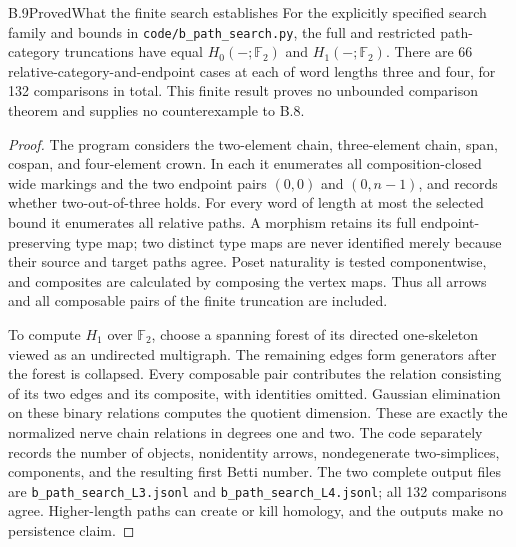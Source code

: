 \begin{result}{B.9}{Proved}{What the finite search establishes}
For the explicitly specified search family and bounds in
\texttt{code/b\_path\_search.py}, the full and restricted path-category truncations have equal $H_0(-;\mathbb F_2)$ and $H_1(-;\mathbb F_2)$. There are 66 relative-category-and-endpoint cases at each of word lengths three and four, for 132 comparisons in total. This finite result proves no unbounded comparison theorem and supplies no counterexample to B.8.
\end{result}
\begin{proof}
The program considers the two-element chain, three-element chain, span, cospan, and four-element crown. In each it enumerates all composition-closed wide markings and the two endpoint pairs $(0,0)$ and $(0,n-1)$, and records whether two-out-of-three holds. For every word of length at most the selected bound it enumerates all relative paths. A morphism retains its full endpoint-preserving type map; two distinct type maps are never identified merely because their source and target paths agree. Poset naturality is tested componentwise, and composites are calculated by composing the vertex maps. Thus all arrows and all composable pairs of the finite truncation are included.

To compute $H_1$ over $\mathbb F_2$, choose a spanning forest of its directed one-skeleton viewed as an undirected multigraph. The remaining edges form generators after the forest is collapsed. Every composable pair contributes the relation consisting of its two edges and its composite, with identities omitted. Gaussian elimination on these binary relations computes the quotient dimension. These are exactly the normalized nerve chain relations in degrees one and two. The code separately records the number of objects, nonidentity arrows, nondegenerate two-simplices, components, and the resulting first Betti number. The two complete output files are \texttt{b\_path\_search\_L3.jsonl} and \texttt{b\_path\_search\_L4.jsonl}; all 132 comparisons agree. Higher-length paths can create or kill homology, and the outputs make no persistence claim.
\end{proof}
